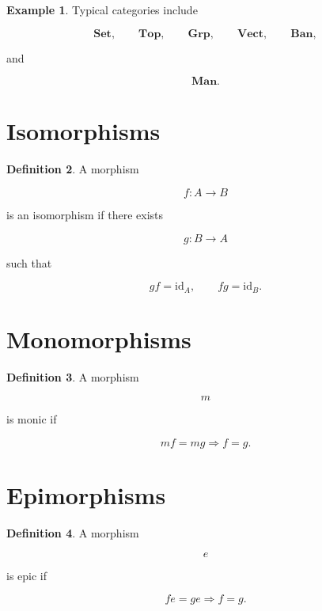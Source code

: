 \documentclass[11pt]{book}
\numberwithin{equation}{chapter}
\theoremstyle{definition}
\newtheorem{definition}{Definition}[chapter]
\newtheorem{example}[definition]{Example}
\theoremstyle{plain}
\begin{document}
\begin{example}

Typical categories include

\[
\mathbf{Set},
\qquad
\mathbf{Top},
\qquad
\mathbf{Grp},
\qquad
\mathbf{Vect},
\qquad
\mathbf{Ban},
\]

and

\[
\mathbf{Man}.
\]

\end{example}


\section{Isomorphisms}

\begin{definition}

A morphism

\[
f:A\rightarrow B
\]

is an isomorphism if there exists

\[
g:B\rightarrow A
\]

such that

\[
gf=\mathrm{id}_A,
\qquad
fg=\mathrm{id}_B.
\]

\end{definition}


\section{Monomorphisms}

\begin{definition}

A morphism

\[
m
\]

is monic if

\[
mf=mg
\Longrightarrow
f=g.
\]

\end{definition}


\section{Epimorphisms}

\begin{definition}

A morphism

\[
e
\]

is epic if

\[
fe=ge
\Longrightarrow
f=g.
\]

\end{definition}
\end{document}
